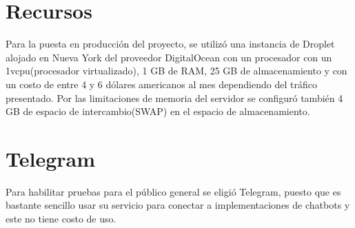 \section{Recursos}

Para la puesta en producción del proyecto, se utilizó una instancia de Droplet alojado en Nueva
York del proveedor DigitalOcean con un procesador con un 1vcpu(procesador virtualizado), 1 GB de
RAM, 25 GB de almacenamiento y con un costo de entre 4 y 6 dólares americanos al mes dependiendo
del tráfico presentado. Por las limitaciones de memoria del servidor se configuró también 4 GB de
espacio de intercambio(SWAP) en el espacio de almacenamiento.

\section{Telegram}

Para habilitar pruebas para el público general se eligió Telegram, puesto que es bastante sencillo
usar su servicio para conectar a implementaciones de chatbots y este no tiene costo de uso.
\cite{botfather}
